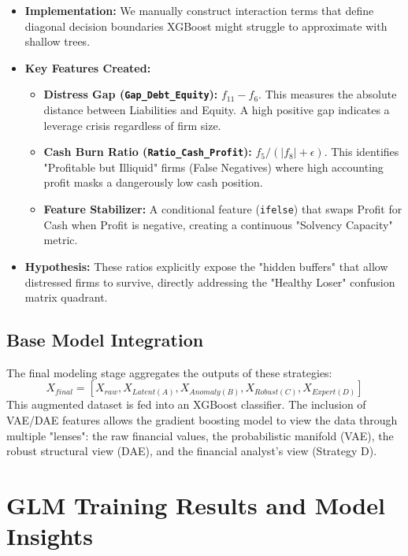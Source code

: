 \documentclass{report}\usepackage[]{graphicx}\usepackage[]{xcolor}
\begin{document}
\begin{itemize}
    \item \textbf{Implementation:} We manually construct interaction terms that define diagonal decision boundaries XGBoost might struggle to approximate with shallow trees.
    \item \textbf{Key Features Created:}
    \begin{itemize}
        \item \textbf{Distress Gap (\texttt{Gap\_Debt\_Equity}):} $f_{11} - f_6$. This measures the absolute distance between Liabilities and Equity. A high positive gap indicates a leverage crisis regardless of firm size.
        \item \textbf{Cash Burn Ratio (\texttt{Ratio\_Cash\_Profit}):} $f_5 / (|f_8| + \epsilon)$. This identifies "Profitable but Illiquid" firms (False Negatives) where high accounting profit masks a dangerously low cash position.
        \item \textbf{Feature Stabilizer:} A conditional feature (\texttt{ifelse}) that swaps Profit for Cash when Profit is negative, creating a continuous "Solvency Capacity" metric.
    \end{itemize}
    \item \textbf{Hypothesis:} These ratios explicitly expose the "hidden buffers" that allow distressed firms to survive, directly addressing the "Healthy Loser" confusion matrix quadrant.
\end{itemize}

\section{Base Model Integration}

The final modeling stage aggregates the outputs of these strategies:
\begin{equation}
    X_{final} = [X_{raw}, X_{Latent(A)}, X_{Anomaly(B)}, X_{Robust(C)}, X_{Expert(D)}]
\end{equation}
This augmented dataset is fed into an XGBoost classifier. The inclusion of VAE/DAE features allows the gradient boosting model to view the data through multiple "lenses": the raw financial values, the probabilistic manifold (VAE), the robust structural view (DAE), and the financial analyst's view (Strategy D).


\chapter{GLM Training Results and Model Insights}
\end{document}
